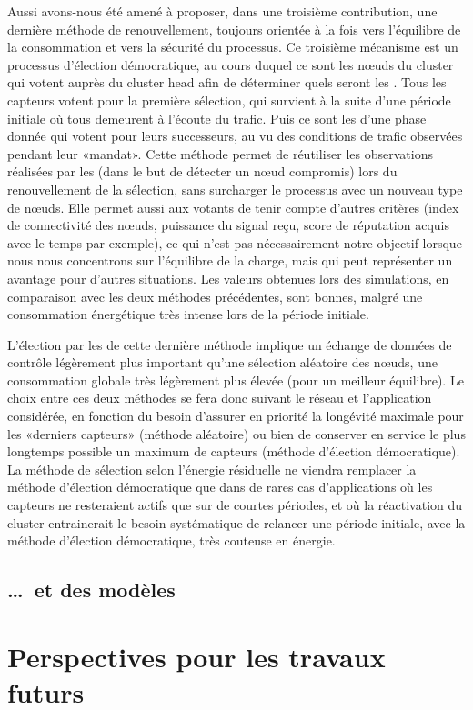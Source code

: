 Aussi avons-nous été amené à proposer, dans une troisième contribution, une dernière méthode de renouvellement, toujours orientée à la fois vers l'équilibre de la consommation et vers la sécurité du processus.
Ce troisième mécanisme est un processus d'élection démocratique, au cours duquel ce sont les nœuds du cluster qui votent auprès du cluster head afin de déterminer quels seront les \cnst.
Tous les capteurs votent pour la première sélection, qui survient à la suite d'une période initiale où tous demeurent à l'écoute du trafic.
Puis ce sont les \cnst d'une phase donnée qui votent pour leurs successeurs, au vu des conditions de trafic observées pendant leur «mandat».
Cette méthode permet de réutiliser les observations réalisées par les \cnst (dans le but de détecter un nœud compromis) lors du renouvellement de la sélection, sans surcharger le processus avec un nouveau type de nœuds.
Elle permet aussi aux votants de tenir compte d'autres critères (index de connectivité des nœuds, puissance du signal reçu, score de réputation acquis avec le temps par exemple), ce qui n'est pas nécessairement notre objectif lorsque nous nous concentrons sur l'équilibre de la charge, mais qui peut représenter un avantage pour d'autres situations.
Les valeurs obtenues lors des simulations, en comparaison avec les deux méthodes précédentes, sont bonnes, malgré une consommation énergétique très intense lors de la période initiale.

L'élection par les \cnst de cette dernière méthode implique un échange de données de contrôle légèrement plus important qu'une sélection aléatoire des nœuds, \cad une consommation globale très légèrement plus élevée (pour un meilleur équilibre).
Le choix entre ces deux méthodes se fera donc suivant le réseau et l'application considérée, en fonction du besoin d'assurer en priorité la longévité maximale pour les «derniers capteurs» (méthode aléatoire) ou bien de conserver en service le plus longtemps possible un maximum de capteurs (méthode d'élection démocratique).
La méthode de sélection selon l'énergie résiduelle ne viendra remplacer la méthode d'élection démocratique que dans de rares cas d'applications où les capteurs ne resteraient actifs que sur de courtes périodes, et où la réactivation du cluster entrainerait le besoin systématique de relancer une période initiale, avec la méthode d'élection démocratique, très couteuse en énergie.

    \subsection{\dots\ et des modèles}



\section{Perspectives pour les travaux futurs}
